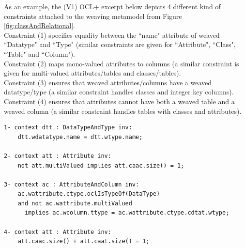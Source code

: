 \documentclass{llncs}
\begin{document}
As an example, the (V1) OCL+ excerpt below depicts 4 different kind of constraints attached to the weaving metamodel from Figure \ref{fig:classAndRelational}.\\
Constraint (1) specifies equality between the ``name" attribute of weaved ``Datatype" and ``Type" (similar constraints are given for ``Attribute", ``Class", ``Table" and ``Column").\\
Constraint (2) maps mono-valued attributes to columns (a similar constraint is given for multi-valued attributes/tables and classes/tables).\\
Constraint (3) ensures that weaved attributes/columns have a weaved datatype/type (a similar constraint handles classes and integer key columns).\\
Constraint (4) ensures that attributes cannot have both a weaved table and a weaved column (a similar constraint handles tables with classes and attributes).

\begin{verbatim}
1- context dtt : DataTypeAndType inv:
    dtt.wdatatype.name = dtt.wtype.name;
    
2- context att : Attribute inv:
    not att.multiValued implies att.caac.size() = 1;
    
3- context ac : AttributeAndColumn inv:
    ac.wattribute.ctype.oclIsTypeOf(DataType)
    and not ac.wattribute.multiValued
      implies ac.wcolumn.ttype = ac.wattribute.ctype.cdtat.wtype;
      
4- context att : Attribute inv:
    att.caac.size() + att.caat.size() = 1;
\end{verbatim}
%
%
\end{document}
